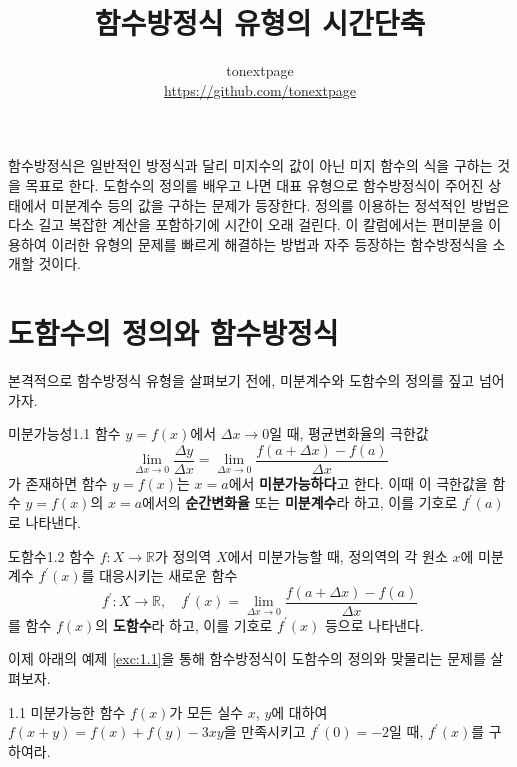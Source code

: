 \documentclass{article}
\title{함수방정식 유형의 시간단축}
\author{tonextpage\\
    \url{https://github.com/tonextpage}
}
\date{}
\begin{document}
\maketitle

\noindent 함수방정식은 일반적인 방정식과 달리 미지수의 값이 아닌 미지 함수의 식을 구하는 것을 목표로 한다. 도함수의 정의를 배우고 나면 대표 유형으로 함수방정식이 주어진 상태에서 미분계수 등의 값을 구하는 문제가 등장한다. 정의를 이용하는 정석적인 방법은 다소 길고 복잡한 계산을 포함하기에 시간이 오래 걸린다. 이 칼럼에서는 편미분을 이용하여 이러한 유형의 문제를 빠르게 해결하는 방법과 자주 등장하는 함수방정식을 소개할 것이다.

\section{도함수의 정의와 함수방정식}
본격적으로 함수방정식 유형을 살펴보기 전에, 미분계수와 도함수의 정의를 짚고 넘어가자.

\begin{dfn}{미분가능성}{1.1}
	함수 $y=f(x)$에서 $\Delta x\to 0$일 때, 평균변화율의 극한값
	\[
		\lim\limits_{\Delta x\to0}\frac{\Delta y}{\Delta x}=\lim\limits_{\Delta x\to 0}\frac{f(a+\Delta x)-f(a)}{\Delta x}
	\]
	가 존재하면 함수 $y=f(x)$는 $x=a$에서 \textbf{미분가능하다}고 한다. 이때 이 극한값을 함수 $y=f(x)$의 $x=a$에서의 \textbf{순간변화율} 또는 \textbf{미분계수}라 하고, 이를 기호로 $f^\prime(a)$로 나타낸다.
\end{dfn}

\begin{dfn}{도함수}{1.2}
	함수 $f:X\to\mathbb R$가 정의역 $X$에서 미분가능할 때, 정의역의 각 원소 $x$에 미분계수 $f^\prime(x)$를 대응시키는 새로운 함수
	\[
		f^\prime:X\to\mathbb R,\quad f^\prime(x)=\lim\limits_{\Delta x\to0}\frac{f(a+\Delta x)-f(a)}{\Delta x}
	\]
	를 함수 $f(x)$의 \textbf{도함수}라 하고, 이를 기호로 $f^\prime(x)$ 등으로 나타낸다.
\end{dfn}

이제 아래의 예제 \ref{exc:1.1}을 통해 함수방정식이 도함수의 정의와 맞물리는 문제를 살펴보자.

\begin{exc}{}{1.1}
	미분가능한 함수 $f(x)$가 모든 실수 $x$, $y$에 대하여 $f(x+y)=f(x)+f(y)-3xy$을 만족시키고 $f^\prime(0)=-2$일 때, $f^\prime(x)$를 구하여라.
\end{exc}
\end{document}
